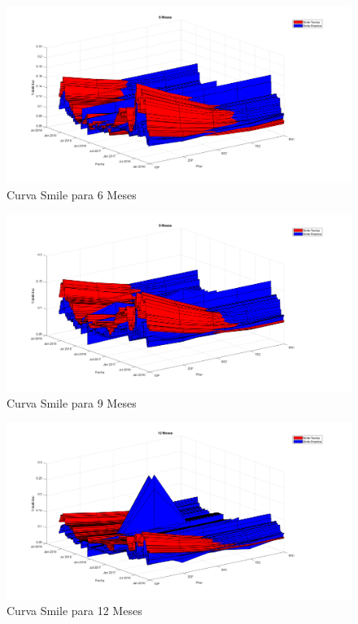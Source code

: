 \begin{figure}[H]
    \begin{center}
    \includegraphics[width = 14cm]{figures/Smile3d6Meses.png}
    \caption{Curva Smile para 6 Meses}
    \label{smile3} %
    \end{center}
\end{figure}
\begin{figure}[H]
    \begin{center}
    \includegraphics[width = 14cm]{figures/Smile3d9Meses.png}
    \caption{Curva Smile para 9 Meses}
    \label{smile4} %
    \end{center}
\end{figure}
\begin{figure}[H]
    \begin{center}
    \includegraphics[width = 14cm]{figures/Smile3d12Meses.png}
    \caption{Curva Smile para 12 Meses}
    \label{smile5} %
    \end{center}
\end{figure}

